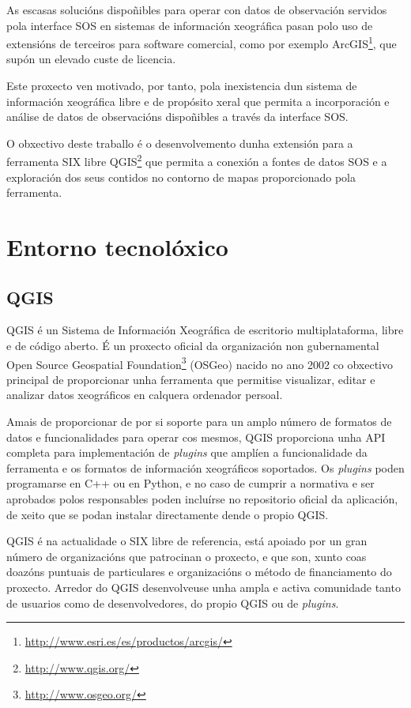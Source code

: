 As escasas solucións dispoñibles para operar con datos de observación servidos pola interface SOS en sistemas de información xeográfica pasan polo uso de extensións de terceiros para software comercial, como por exemplo ArcGIS\footnote{\url{http://www.esri.es/es/productos/arcgis/}}, que supón un elevado custe de licencia.

Este proxecto ven motivado, por tanto, pola inexistencia dun sistema de información xeográfica libre e de propósito xeral que permita a incorporación e análise de datos de observacións dispoñibles a través da interface SOS.

O obxectivo deste traballo é o desenvolvemento dunha extensión para a ferramenta SIX libre QGIS\footnote{\url{http://www.qgis.org/}} que permita a conexión a fontes de datos SOS e a exploración dos seus contidos no contorno de mapas proporcionado pola ferramenta.

\section{Entorno tecnolóxico}
\subsection{QGIS}
QGIS é un Sistema de Información Xeográfica de escritorio multiplataforma, libre e de código aberto. É un proxecto oficial da organización non gubernamental Open Source Geospatial Foundation\footnote{\url{http://www.osgeo.org/}} (OSGeo) nacido no ano 2002 co obxectivo principal de proporcionar unha ferramenta que permitise visualizar, editar e analizar datos xeográficos en calquera ordenador persoal.

Amais de proporcionar de por si soporte para un amplo número de formatos de datos e funcionalidades para operar cos mesmos, QGIS proporciona unha API completa para implementación de \emph{plugins} que amplíen a funcionalidade da ferramenta e os formatos de información xeográficos soportados. Os \emph{plugins} poden programarse en C++ ou en Python, e no caso de cumprir a normativa e ser aprobados polos responsables poden incluírse no repositorio oficial da aplicación, de xeito que se podan instalar directamente dende o propio QGIS.

QGIS é na actualidade o SIX libre de referencia, está apoiado por un gran número de organizacións que patrocinan o proxecto, e que son, xunto coas doazóns puntuais de particulares e organizacións o método de financiamento do proxecto. Arredor do QGIS desenvolveuse unha ampla e activa comunidade tanto de usuarios como de desenvolvedores, do propio QGIS ou de \emph{plugins}.

